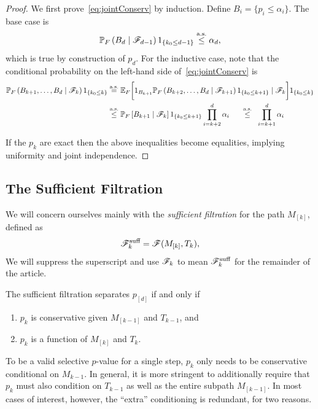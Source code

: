 \documentclass{article}
\begin{document}
\begin{proof}
  We first prove~\eqref{eq:jointConserv}
  by induction. Define $B_i = \{p_i \leq \alpha_i\}$. 
  The base case is
  \[
  \mathbb{P}_F\left(B_d \mid \mathscr{F}_{d-1}\right)1_{\{k_0 \leq d-1\}} \overset{\textrm{a.s.}}{\leq} \alpha_d,
  \]
  which is true by construction of $p_d$. 
  For the inductive case, note that the
  conditional probability on the left-hand side
  of~\eqref{eq:jointConserv} is
  \begin{align*}
    \mathbb{P}_F\left(B_{k+1}, \ldots, B_d
      \mid \mathscr{F}_k\right)1_{\{k_0 \leq k\}} 
    &\overset{\textrm{a.s.}}{=} \mathbb{E}_F\bigg[ 1_{B_{k+1}} 
    \mathbb{P}_F\left(B_{k+2}, \ldots, B_d
      \mid \mathscr{F}_{k+1}\right)1_{\{k_0 \leq k+1\}}
    \mid \mathscr{F}_k\bigg]1_{\{k_0 \leq k\}}\\
    &\overset{\textrm{a.s.}}{\leq} \mathbb{P}_F\left[ B_{k+1}
      \mid \mathscr{F}_k\right]1_{\{k_0 \leq k+1\}}\prod_{i=k+2}^d \alpha_i
    \quad\;\;\overset{\textrm{a.s.}}{\leq}\;\; \prod_{i=k+1}^d \alpha_i
  \end{align*}

  If the $p_k$ are exact then the above 
  inequalities become equalities, implying uniformity and joint independence.
\end{proof}

\subsection{The Sufficient Filtration}\label{sec:suffFilt}

We will concern ourselves mainly with the {\em sufficient filtration} for the path $M_{[k]}$, defined as
\[
\mathscr{F}_k^{\text{suff}} = \mathscr{F}(M_{[k]}, T_k),
\]
We will suppress the superscript and use $\mathscr{F}_k$ to mean $\mathscr{F}_k^{\text{suff}}$ for the remainder of the article. 

The sufficient filtration separates $p_{[d]}$ if and only if 
\begin{enumerate}
\item $p_k$ is conservative given $M_{[k-1]}$ and $T_{k-1}$, and
\item $p_k$ is a function of $M_{[k]}$ and $T_k$.
\end{enumerate}

To be a valid selective $p$-value for a single step, $p_k$ only needs to be conservative conditional on $M_{k-1}$. In general, it is more stringent to additionally require that $p_k$ must also condition on $T_{k-1}$ as well as the entire subpath $M_{[k-1]}$. In most cases of interest, however, the ``extra'' conditioning is redundant, for two reasons. 
\end{document}
